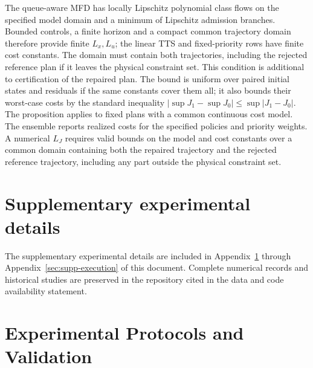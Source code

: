 \documentclass[journal,10pt]{IEEEtran}
\newcommand{\appref}[1]{Appendix~\ref{#1}}
\begin{document}
The queue-aware MFD has locally Lipschitz polynomial class flows on the
specified model domain and a minimum of Lipschitz admission branches.
Bounded controls, a finite horizon and a compact common trajectory domain
therefore provide finite $L_x,L_u$; the linear TTS and fixed-priority rows
have finite cost constants. The domain must contain both trajectories,
including the rejected reference plan if it leaves the physical constraint
set. This condition is additional to certification of the repaired plan.
The bound is uniform over paired initial states and residuals if the same
constants cover them all; it also bounds their worst-case costs by the
standard inequality $|\sup J_1-\sup J_0|\le\sup|J_1-J_0|$.
The proposition applies to fixed plans with a common continuous cost model.
The ensemble reports realized costs for the specified policies and
priority weights. A numerical $L_J$ requires valid bounds on the model and
cost constants over a common domain containing both the repaired trajectory
and the rejected reference trajectory, including any part outside the
physical constraint set.

\FloatBarrier
\section*{Supplementary experimental details}
The supplementary experimental details are included in
\appref{app:reusable-benchmark} through \appref{sec:supp-execution}
of this document. Complete numerical records and historical studies
are preserved in the repository cited in the data and code availability
statement.

\section{Experimental Protocols and Validation}
\label{app:reusable-benchmark}
\end{document}
